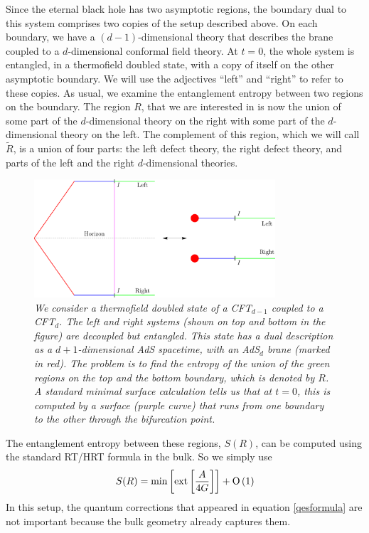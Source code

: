 \documentclass[12pt]{article}
\def\gnewt{G}
\def\Or[#1]{{\text{O}}\left({#1}\right)}
\newcommand{\be}{\begin{equation}}
\newcommand{\ee}{\end{equation}}
\begin{document}
Since the eternal black hole has two asymptotic regions, the boundary dual to this system comprises two copies of the setup described above. On each boundary, we have a $(d-1)$-dimensional theory that describes the brane coupled to a $d$-dimensional conformal field theory. At $t = 0$, the whole system is entangled, in a thermofield doubled state, with a copy of itself on the other asymptotic boundary. We will use the adjectives ``left'' and ``right'' to refer to
these copies. As usual, we examine the entanglement entropy between two regions on the boundary. The region  $R$, that we are interested in is now the union of some part of the $d$-dimensional theory on the right with some part of the $d$-dimensional theory on the left. The complement of this region, which we will call $\widetilde{R}$, is a union of four parts: the left defect theory, the right defect theory,  and parts of the left and the right $d$-dimensional theories. 


\begin{figure}[!ht]
\begin{center}
\includegraphics[width=0.8\textwidth]{rsbranesetup.pdf}
\caption{\em We consider a thermofield doubled state of  a CFT$_{d-1}$ coupled to a CFT$_d$. The left and right systems (shown on top and bottom in the figure) are decoupled but entangled. This state has a dual description as a $d+1$-dimensional AdS spacetime,  with an AdS$_d$  brane (marked in red). The problem is to find the entropy of the union of the green regions on the top and the bottom boundary, which is denoted by $R$. A standard minimal surface calculation tells us that at $t = 0$, this is computed by a surface (purple curve) that runs from one boundary to the other through the bifurcation point. \label{rsinit}}
\end{center}
\end{figure}

The entanglement entropy between these regions, $S(R)$, can be computed using the standard RT/HRT formula in the bulk. So we simply use
\be
\label{rtformula}
S(R) = \text{min}\left[ \text{ext} \left[{A \over 4 \gnewt}  \right] \right] + \Or[1]
\ee
In this setup, the quantum corrections that appeared in equation \eqref{qesformula} are not important because the bulk geometry already captures them.
\end{document}
